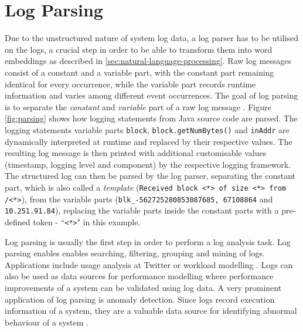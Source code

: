 \begin{comment}
Log messages are the result of the insertion of a variable part in a logging instruction (e.g. \textit{printf("Instance \%s shut down with errors, \%s)} in software code that is being output during execution. The constant parts can usually be found in source codes written by developers, while the variable parts are inserted dynamically during execution. As these logs are unstructured text, have to undergo certain pre-processing steps before they can be analysed for anomalies. Each log event can be parsed into a log template, leaving only the constant part, as it can be seen in figure \ref{fig:parsing}.
\end{comment}


\section{Log Parsing \label{sec:backgroundlogparsing}}
Due to the unstructured nature of system log data, a log parser has to be utilised on the logs, a crucial step in order to be able to transform them into word embeddings as described in \ref{sec:natural-language-processing}.
Raw log messages consist of a constant and a variable part, with the constant part remaining identical for every occurrence, while the variable part records runtime information and varies among different event occurrences. The goal of log parsing is to separate the \textit{constant} and \textit{variable} part of a raw log message \cite{he2017towards}\cite{zhu2019tools}. Figure \ref{fig:parsing} shows how logging statements from Java source code are parsed. The logging statements variable parts \verb!block!, \verb!block.getNumBytes()! and \verb!inAddr! are dynamically interpreted at runtime and replaced by their respective values. The resulting log message is then printed with additional customisable values (timestamp, logging level and component) by the respective logging framework. The structured log can then be parsed by the log parser, separating the constant part, which is also called a \textit{template} (\verb!Received block <*> of size <*> from /<*>!), from the variable parts (\verb!blk_-562725280853087685, 67108864! and \verb!10.251.91.84!), replacing the variable parts inside the constant parts with a pre-defined token - ``\verb!<*>!" in this example.

Log parsing is usually the first step in order to perform a log analysis task. Log parsing enables enables searching, filtering, grouping and mining of logs. Applications include usage analysis at Twitter \cite{lee2012unified} or workload modelling \cite{barham2004using}. Logs can also be used as data sources for performance modelling \cite{chow2014mystery} where performance improvements of a system can be validated using log data. A very prominent application of log parsing is anomaly detection. Since logs record execution information of a system, they are a valuable data source for identifying abnormal behaviour of a system \cite{zhu2019tools}.

